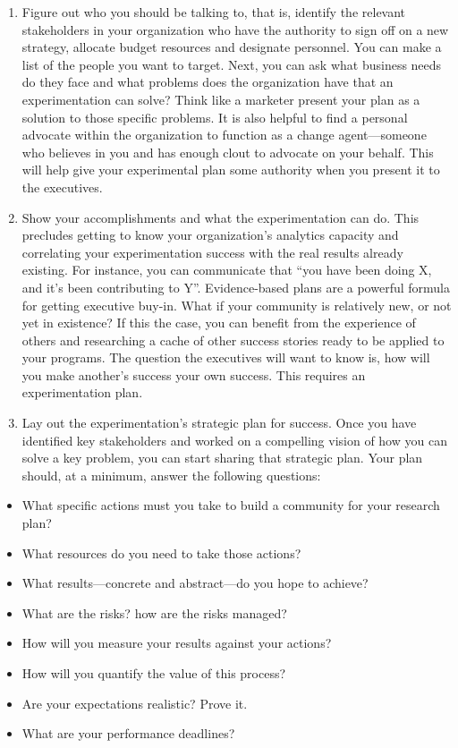 \documentclass[openany]{book}
\providecommand{\tightlist}{%
  \setlength{\itemsep}{0pt}\setlength{\parskip}{0pt}}
\begin{document}
\begin{enumerate}
\def\labelenumi{\arabic{enumi}.}
\item
  Figure out who you should be talking to, that is, identify the relevant stakeholders in your organization who have the authority to sign off on a new strategy, allocate budget resources and designate personnel. You can make a list of the people you want to target. Next, you can ask what business needs do they face and what problems does the organization have that an experimentation can solve? Think like a marketer present your plan as a solution to those specific problems. It is also helpful to find a personal advocate within the organization to function as a change agent---someone who believes in you and has enough clout to advocate on your behalf. This will help give your experimental plan some authority when you present it to the executives.
\item
  Show your accomplishments and what the experimentation can do. This precludes getting to know your organization's analytics capacity and correlating your experimentation success with the real results already existing. For instance, you can communicate that ``you have been doing X, and it's been contributing to Y''. Evidence-based plans are a powerful formula for getting executive buy-in. What if your community is relatively new, or not yet in existence? If this the case, you can benefit from the experience of others and researching a cache of other success stories ready to be applied to your programs. The question the executives will want to know is, how will you make another's success your own success. This requires an experimentation plan.
\item
  Lay out the experimentation's strategic plan for success. Once you have identified key stakeholders and worked on a compelling vision of how you can solve a key problem, you can start sharing that strategic plan. Your plan should, at a minimum, answer the following questions:
\end{enumerate}

\begin{itemize}
\tightlist
\item
  What specific actions must you take to build a community for your research plan?
\item
  What resources do you need to take those actions?
\item
  What results---concrete and abstract---do you hope to achieve?
\item
  What are the risks? how are the risks managed?
\item
  How will you measure your results against your actions?
\item
  How will you quantify the value of this process?
\item
  Are your expectations realistic? Prove it.
\item
  What are your performance deadlines?
\end{itemize}
\end{document}
